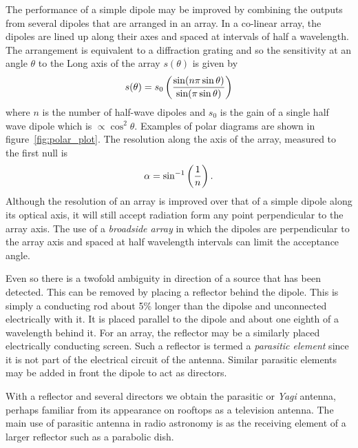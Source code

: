 The performance of a simple dipole may be improved by combining the 
outputs from several dipoles that are arranged in an array. In a co-linear 
array, the dipoles are lined up along their axes and spaced at intervals
of half a wavelength. The arrangement is equivalent to a diffraction
grating and so the sensitivity at an angle $\theta$ to the Long axis
of the array $s(\theta)$ is given by
\[
s(\theta)=s_0\left({\sin(n\pi\sin\theta)\over\sin(\pi\sin\theta)}\right)
\]
where $n$ is the number of half-wave dipoles and $s_0$ is the gain of a single
half wave dipole which is $\propto \cos^2\theta$. 
Examples of polar diagrams are shown in figure~\ref{fig:polar_plot}.
The resolution along the axis of the array, measured to the
first null is 
\[
\alpha=\sin^{-1}\left(1\over n\right).
\]
Although the resolution of an array is improved over that of a simple dipole along 
its optical axis, it will still accept radiation form any point perpendicular to the array
axis. The use of a {\it broadside array} in which the dipoles are perpendicular to the 
array axis and spaced at half wavelength intervals can limit the acceptance angle. 

Even so there is a twofold ambiguity in direction of a source that has been detected. 
This can be removed by placing a reflector behind the dipole. This is simply a conducting rod 
about 5\% longer than the dipolse and unconnected electrically with it. It
is placed parallel to the dipole and about one eighth of a wavelength behind
it. For an array, the reflector may be a similarly placed electrically 
conducting screen. Such a reflector is termed a {\it parasitic element} since it is not part 
of the electrical circuit of the antenna. Similar parasitic elements may be added in front 
the dipole to act as directors.

With a reflector and several directors we obtain the parasitic or {\it Yagi} antenna, perhaps 
familiar from its appearance on rooftops as a television antenna. The main use of parasitic
antenna in radio astronomy is as the receiving element of a larger reflector such as a parabolic
dish.

